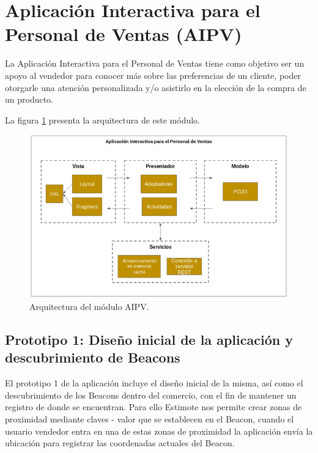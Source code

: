 \section{Aplicación Interactiva para el Personal de Ventas (AIPV)}


La Aplicación Interactiva para el Personal de Ventas tiene como objetivo ser un apoyo al vendedor para conocer más sobre las preferencias de un cliente, poder otorgarle una atención personalizada y/o asistirlo en la elección de la compra de un producto. \\ \par
La figura \ref{arq-AIPV}  presenta la arquitectura de este módulo.
\FloatBarrier
\begin{figure}[htbp!]
		\centering
			\includegraphics[width=.9 \textwidth]{imagenes/Arquitecturas/arquiVendedor}
		\caption{Arquitectura del módulo AIPV.}
		\label{arq-AIPV}
\end{figure}
\FloatBarrier

\subsection{Prototipo 1: Diseño inicial de la aplicación y descubrimiento de Beacons}

El prototipo 1 de la aplicación incluye el diseño inicial de la misma, así como el descubrimiento de los Beacons dentro del comercio, con el fin de mantener un registro de donde se encuentran. Para ello Estimote nos permite crear zonas de proximidad mediante claves - valor que se establecen en el Beacon, cuando el usuario vendedor entra en una de estas zonas de proximidad la aplicación envía la ubicación para registrar las coordenadas actuales del Beacon.  \\ \par

